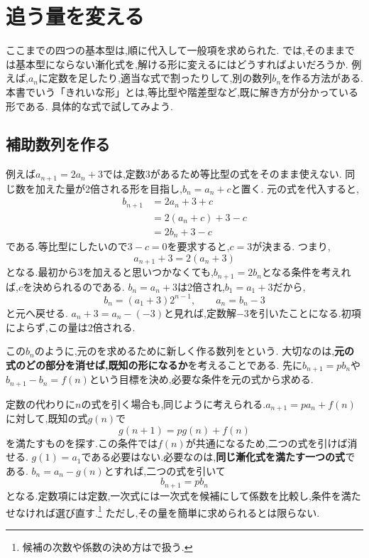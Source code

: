 \section{追う量を変える}\label{節：追う量を変える}
ここまでの四つの基本型は,順に代入して一般項を求められた.
では,そのままでは基本型にならない漸化式を,解ける形に変えるにはどうすればよいだろうか.
例えば,$a_n$に定数を足したり,適当な式で割ったりして,別の数列$b_n$を作る方法がある.
本書でいう「きれいな形」とは,等比型や階差型など,既に解き方が分かっている形である.
具体的な式で試してみよう.

  \subsection{補助数列を作る}\label{節：補助数列の設計}
    例えば$a_{n+1}=2a_n+3$では,定数$3$があるため等比型の式をそのまま使えない.
    同じ数を加えた量が2倍される形を目指し,$b_n=a_n+c$と置く.
    元の式を代入すると,
    \[
      \begin{aligned}
        b_{n+1}&=2a_n+3+c\\
               &=2(a_n+c)+3-c\\
               &=2b_n+3-c
      \end{aligned}
    \]
    である.等比型にしたいので$3-c=0$を要求すると,$c=3$が決まる.
    つまり,
    \[
      a_{n+1}+3=2(a_n+3)
    \]
    となる.最初から$3$を加えると思いつかなくても,$b_{n+1}=2b_n$となる条件を考えれば,$c$を決められるのである.
    $b_n=a_n+3$は2倍され,$b_1=a_1+3$だから,
    \[
      b_n=(a_1+3)2^{n-1},\qquad a_n=b_n-3
    \]
    と元へ戻せる.
    $a_n+3=a_n-(-3)$と見れば,定数解$-3$を引いたことになる.初項によらず,この量は$2$倍される.

    この$b_n$のように,元のを求めるために新しく作る数列を\textbf{}という.
    大切なのは,\textbf{元の式のどの部分を消せば,既知の形になるか}を考えることである.
    先に$b_{n+1}=pb_n$や$b_{n+1}-b_n=f(n)$という目標を決め,必要な条件を元の式から求める.

    定数の代わりに$n$の式を引く場合も,同じように考えられる.$a_{n+1}=pa_n+f(n)$に対して,既知の式$g(n)$で
    \[
      g(n+1)=pg(n)+f(n)
    \]
    を満たすものを探す.この条件では$f(n)$が共通になるため,二つの式を引けば消せる.
    $g(1)=a_1$である必要はない.必要なのは,\textbf{同じ漸化式を満たす一つの式}である.
    $b_n=a_n-g(n)$とすれば,二つの式を引いて
    \[
      b_{n+1}=pb_n
    \]
    となる.定数項には定数,一次式には一次式を候補にして係数を比較し,条件を満たせなければ選び直す.\footnote{候補の次数や係数の決め方はで扱う.}
    ただし,その量を簡単に求められるとは限らない.

